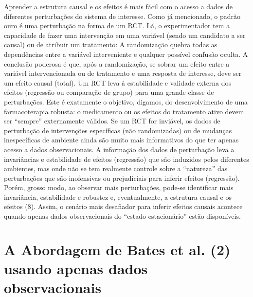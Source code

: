     Aprender a estrutura causal e os efeitos é mais fácil com o acesso a dados de diferentes perturbações do sistema de interesse. Como já mencionado, o padrão ouro é uma perturbação na forma de um RCT. Lá, o experimentador tem a capacidade de fazer uma intervenção em uma variável (sendo um candidato a ser causal) ou de atribuir um tratamento: A randomização quebra todas as dependências entre a variável interveniente e qualquer possível confusão oculta. A conclusão poderosa é que, após a randomização, se sobrar um efeito entre a variável intervencionada ou de tratamento e uma resposta de interesse, deve ser um efeito causal (total). Um RCT leva à estabilidade e validade externa dos efeitos (regressão ou comparação de grupo) para uma grande classe de perturbações. Este é exatamente o objetivo, digamos, do desenvolvimento de uma farmacoterapia robusta: o medicamento ou os efeitos do tratamento ativo devem ser ``sempre'' externamente válidos. Se um RCT for inviável, os dados de perturbação de intervenções específicas (não randomizadas) ou de mudanças inespecíficas de ambiente ainda são muito mais informativos do que ter apenas acesso a dados observacionais. A informação dos dados de perturbação leva a invariâncias e estabilidade de efeitos (regressão) que são induzidos pelos diferentes ambientes, mas onde não se tem realmente controle sobre a ``natureza'' das perturbações que são inofensivas ou prejudiciais para inferir efeitos (regressão). Porém, grosso modo, ao observar mais perturbações, pode-se identificar mais invariância, estabilidade e robustez e, eventualmente, a estrutura causal e os efeitos (8). Assim, o cenário mais desafiador para inferir efeitos causais acontece quando apenas dados observacionais do ``estado estacionário'' estão disponíveis.


\section*{A Abordagem de Bates et al. (2) usando apenas dados observacionais}


